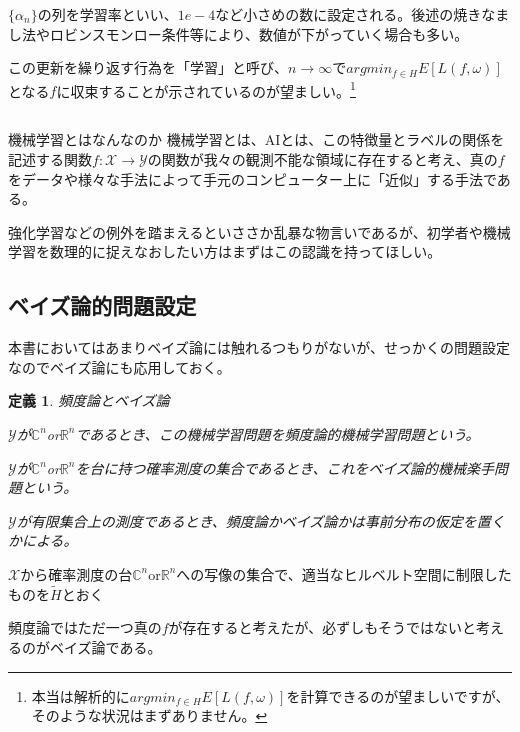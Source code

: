 \documentclass{jsarticle}
\newtheorem{defi}{定義}[section]
\begin{document}
$\{\alpha_n\}$の列を学習率といい、$1e-4$など小さめの数に設定される。後述の焼きなまし法やロビンスモンロー条件等により、数値が下がっていく場合も多い。

この更新を繰り返す行為を「学習」と呼び、$n\to \infty$で$argmin_{f\in H} E[L(f,\omega)]$となる$f$に収束することが示されているのが望ましい。\footnote{本当は解析的に$argmin_{f\in H} E[L(f,\omega)]$を計算できるのが望ましいですが、そのような状況はまずありません。}

\subsection{}

\begin{itembox}[l]{機械学習とはなんなのか}
機械学習とは、AIとは、この特徴量とラベルの関係を記述する関数$f:\mathcal{X}\to \mathcal{Y}$の関数が我々の観測不能な領域に存在すると考え、真の$f$をデータや様々な手法によって手元のコンピューター上に「近似」する手法である。
\end{itembox}

強化学習などの例外を踏まえるといささか乱暴な物言いであるが、初学者や機械学習を数理的に捉えなおしたい方はまずはこの認識を持ってほしい。


\subsection{ベイズ論的問題設定}

本書においてはあまりベイズ論には触れるつもりがないが、せっかくの問題設定なのでベイズ論にも応用しておく。

\begin{defi} 頻度論とベイズ論

$\mathcal{Y}$が$\mathbb{C}^n$or$\mathbb{R}^n$であるとき、この機械学習問題を頻度論的機械学習問題という。

$\mathcal{Y}$が$\mathbb{C}^n$or$\mathbb{R}^n$を台に持つ確率測度の集合であるとき、これをベイズ論的機械楽手問題という。

$\mathcal{Y}$が有限集合上の測度であるとき、頻度論かベイズ論かは事前分布の仮定を置くかによる。

\end{defi}

$\mathcal{X}$から確率測度の台$\mathbb{C}^n$or$\mathbb{R}^n$への写像の集合で、適当なヒルベルト空間に制限したものを$\tilde{H}$とおく

頻度論ではただ一つ真の$f$が存在すると考えたが、必ずしもそうではないと考えるのがベイズ論である。
\end{document}
